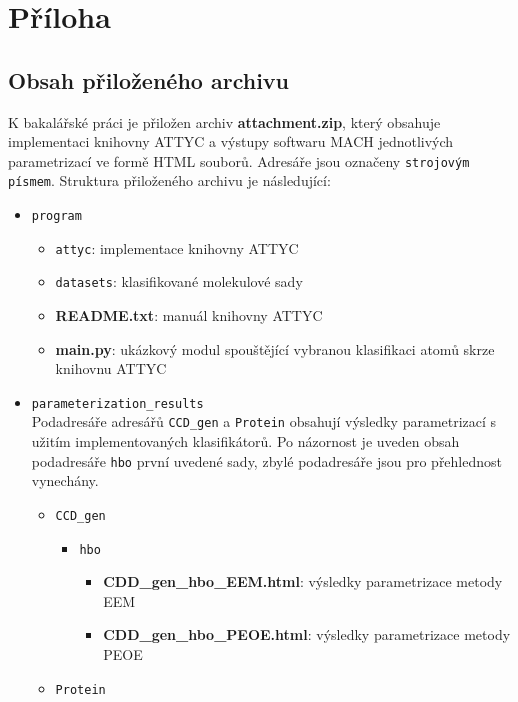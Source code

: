 \chapter*{Příloha}

\section*{Obsah přiloženého archivu}
\label{prilozeny_archiv}
K bakalářské práci je přiložen archiv \textbf{attachment.zip}, který obsahuje implementaci kni\-hovny ATTYC a výstupy softwaru MACH jednotlivých parametrizací ve formě HTML souborů. Adresáře  jsou označeny \verb|strojovým písmem|. Struktura přiloženého archivu je následující: 
\begin{itemize}
    \item \verb|program| 
    \begin{itemize}
        \item \verb|attyc|: implementace knihovny ATTYC
        \item \verb|datasets|: klasifikované molekulové sady 
        \item \textbf{README.txt}: manuál knihovny ATTYC
        \item\textbf{main.py}: ukázkový modul spouštějící vybranou klasifikaci atomů skrze knihovnu ATTYC
    \end{itemize}
    \item \verb|parameterization_results| \\
    Podadresáře adresářů \verb|CCD_gen| a \verb|Protein| obsahují výsledky parametrizací s uži\-tím implementovaných  klasifikátorů. Po názornost je uveden obsah podadresáře \verb|hbo| první uvedené sady, zbylé podadresáře jsou pro přehlednost vynechány.
    \begin{itemize}
        \item \verb|CCD_gen|
        \begin{itemize}
            \item \verb|hbo|
            \begin{itemize}
                \item \textbf{CDD\_gen\_hbo\_EEM.html}: výsledky parametrizace metody EEM
                \item \textbf{CDD\_gen\_hbo\_PEOE.html}: výsledky parametrizace metody PEOE
            \end{itemize}
        \end{itemize}
        \item \verb|Protein|
    \end{itemize}
\end{itemize}
\newpage

